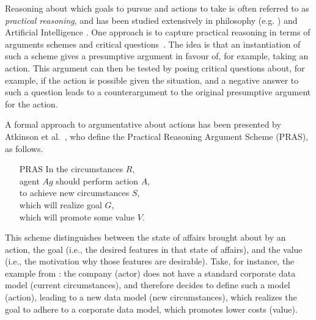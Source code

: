 \documentclass[11.5pt,two column]{llncs}
\begin{document}
Reasoning about which goals to pursue and actions to take is often referred to as \emph{practical reasoning}, and has been studied extensively in philosophy (e.g. \cite{raz1978,walton1990}) and Artificial Intelligence \cite{bratman1987,atkinson2007}. One approach is to capture practical reasoning in terms of arguments schemes and critical questions~\cite{walton1990}. The idea is that an instantiation of such a scheme gives a presumptive argument in favour of, for example, taking an action. This argument can then be tested by posing critical questions about, for example, if the action is possible given the situation, and a negative answer to such a question leads to a counterargument to the original presumptive argument for the action. 

A formal approach to argumentative about actions has been presented by Atkinson et al.~\cite{atkinson2007}, who define the Practical Reasoning Argument Scheme (PRAS), as follows. 
\begin{itemize}[leftmargin=22pt]
\item[PRAS]
In the circumstances $R$,\\
agent $Ag$ should perform action $A$,\\
to achieve new circumstances $S$,\\
which will realize goal $G$,\\
which will promote some value $V$.
\end{itemize}

This scheme distinguishes between the state of affairs brought about by an action, the goal (i.e., the desired features in that state of affairs), and the value (i.e., the motivation why those features are desirable). Take, for instance, the example from \cite{vanZee-etal:er2016}: the company (actor) does not have a standard corporate data model (current circumstances), and therefore decides to define such a model (action), leading to a new data model (new circumstances), which realizes the goal to adhere to a corporate data model, which promotes lower costs (value). 
\end{document}
